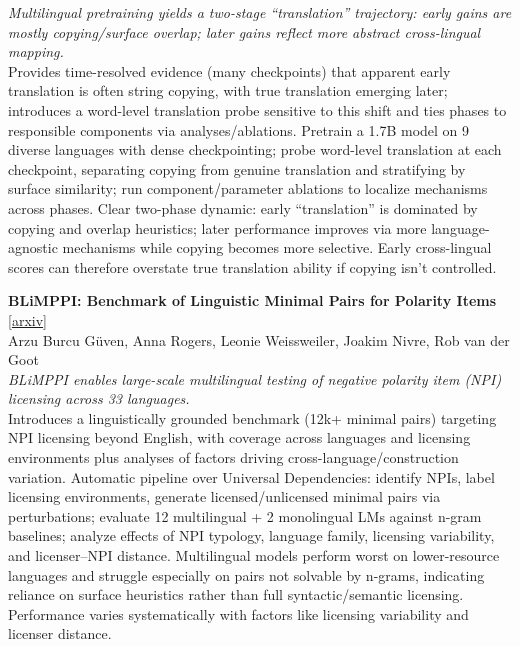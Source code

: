 \documentclass[12pt,letterpaper]{article}
\begin{document}
{\small\textit{Multilingual pretraining yields a two-stage ``translation'' trajectory: early gains are mostly copying/surface overlap; later gains reflect more abstract cross-lingual mapping.}}\\[1pt]
{\footnotesize Provides time-resolved evidence (many checkpoints) that apparent early translation is often string copying, with true translation emerging later; introduces a word-level translation probe sensitive to this shift and ties phases to responsible components via analyses/ablations. Pretrain a 1.7B model on 9 diverse languages with dense checkpointing; probe word-level translation at each checkpoint, separating copying from genuine translation and stratifying by surface similarity; run component/parameter ablations to localize mechanisms across phases. Clear two-phase dynamic: early ``translation'' is dominated by copying and overlap heuristics; later performance improves via more language-agnostic mechanisms while copying becomes more selective. Early cross-lingual scores can therefore overstate true translation ability if copying isn't controlled.}

\medskip

{\small\textbf{BLiMPPI: Benchmark of Linguistic Minimal Pairs for Polarity Items}} {\scriptsize[\href{https://arxiv.org/abs/2610.13607}{arxiv}]}\\
{\scriptsize Arzu Burcu G\"uven, Anna Rogers, Leonie Weissweiler, Joakim Nivre, Rob van der Goot}\\

{\small\textit{BLiMPPI enables large-scale multilingual testing of negative polarity item (NPI) licensing across 33 languages.}}\\[1pt]
{\footnotesize Introduces a linguistically grounded benchmark (12k+ minimal pairs) targeting NPI licensing beyond English, with coverage across languages and licensing environments plus analyses of factors driving cross-language/construction variation. Automatic pipeline over Universal Dependencies: identify NPIs, label licensing environments, generate licensed/unlicensed minimal pairs via perturbations; evaluate 12 multilingual + 2 monolingual LMs against n-gram baselines; analyze effects of NPI typology, language family, licensing variability, and licenser--NPI distance. Multilingual models perform worst on lower-resource languages and struggle especially on pairs not solvable by n-grams, indicating reliance on surface heuristics rather than full syntactic/semantic licensing. Performance varies systematically with factors like licensing variability and licenser distance.}
\end{document}
